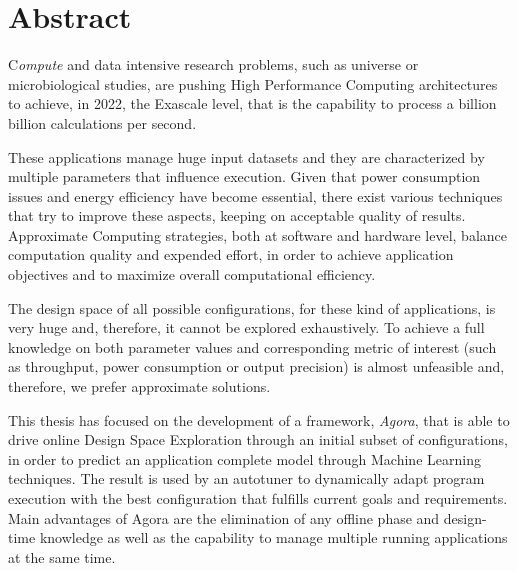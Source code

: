 \chapter*{Abstract}

\lettrine{C}{}\textit{ompute} and data intensive research problems, such as universe or microbiological studies, are pushing High Performance Computing architectures to achieve, in 2022, the Exascale level, that is the capability to process a billion billion calculations per second.

These applications manage huge input datasets and they are characterized by multiple parameters that influence execution. Given that power consumption issues and energy efficiency have become essential, there exist various techniques that try to improve these aspects, keeping on acceptable quality of results. Approximate Computing strategies, both at software and hardware level, balance computation quality and expended effort, in order to achieve application objectives and to maximize overall computational efficiency.

The design space of all possible configurations, for these kind of applications, is very huge and, therefore, it cannot be explored exhaustively. To achieve a full knowledge on both parameter values and corresponding metric of interest (such as throughput, power consumption or output precision) is almost unfeasible and, therefore, we prefer approximate solutions.

This thesis has focused on the development of a framework, \textit{Agora}, that is able to drive online Design Space Exploration through an initial subset of configurations, in order to predict an application complete model through Machine Learning techniques. The result is used by an autotuner to dynamically adapt program execution with the best configuration that fulfills current goals and requirements. Main advantages of Agora are the elimination of any offline phase and design-time knowledge as well as the capability to manage multiple running applications at the same time.
